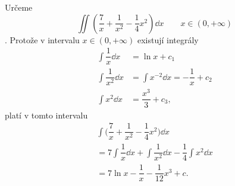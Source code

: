 \begin{mdframed}[style=mdexam]
  \begin{example}\label{MAI:exam144}
    Určeme \[\iint\left(\dfrac{7}{x}+ \dfrac{1}{x^2} - \dfrac{1}{4}x^2\right)\dd{x}\qquad x\in(0,
    +\infty)\]. Protože v intervalu \(x\in(0, +\infty)\) existují integrály
    \begin{align*}
      \int\dfrac{1}{x}\dd{x}   &= \ln x + c_1  \\
      \int\dfrac{1}{x^2}\dd{x} &= \int x^{-2}\dd{x} = -\dfrac{1}{x} + c_2  \\
      \int x^2\dd{x}           &= \dfrac{x^3}{3} + c_3 ,
    \end{align*}  
    platí v tomto intervalu
    \begin{multline*}
      \int\bigl(\dfrac{7}{x}+ \dfrac{1}{x^2} - \dfrac{1}{4}x^2\bigr)\dd{x}                        \\
          =7\int\dfrac{1}{x}\dd{x} + \int\dfrac{1}{x^2}\dd{x} - \dfrac{1}{4}\int x^2\dd{x}        \\
          =7\ln x - \dfrac{1}{x} - \dfrac{1}{12}x^3 + c.
    \end{multline*}
  \end{example}
\end{mdframed}